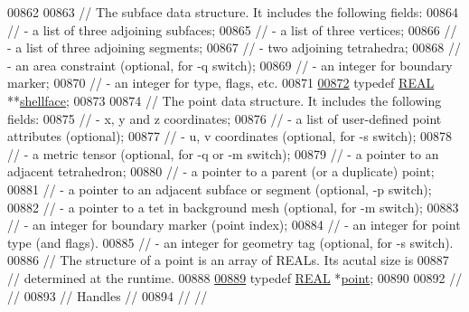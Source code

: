 \begin{DoxyCode}
00862 
00863   \textcolor{comment}{// The subface data structure.  It includes the following fields:}
00864   \textcolor{comment}{//   - a list of three adjoining subfaces;}
00865   \textcolor{comment}{//   - a list of three vertices;}
00866   \textcolor{comment}{//   - a list of three adjoining segments;}
00867   \textcolor{comment}{//   - two adjoining tetrahedra;}
00868   \textcolor{comment}{//   - an area constraint (optional, for -q switch);}
00869   \textcolor{comment}{//   - an integer for boundary marker;}
00870   \textcolor{comment}{//   - an integer for type, flags, etc.}
00871 
\hypertarget{tetgen_8h_source.tex_l00872}{}\hyperlink{classtetgenmesh_ad4860123b88783b943fa6452e886a2cb}{00872}   \textcolor{keyword}{typedef} \hyperlink{tetgen_8h_a4b654506f18b8bfd61ad2a29a7e38c25}{REAL} **\hyperlink{classtetgenmesh_ad4860123b88783b943fa6452e886a2cb}{shellface};
00873 
00874   \textcolor{comment}{// The point data structure.  It includes the following fields:}
00875   \textcolor{comment}{//   - x, y and z coordinates;}
00876   \textcolor{comment}{//   - a list of user-defined point attributes (optional);}
00877   \textcolor{comment}{//   - u, v coordinates (optional, for -s switch);}
00878   \textcolor{comment}{//   - a metric tensor (optional, for -q or -m switch);}
00879   \textcolor{comment}{//   - a pointer to an adjacent tetrahedron;}
00880   \textcolor{comment}{//   - a pointer to a parent (or a duplicate) point;}
00881   \textcolor{comment}{//   - a pointer to an adjacent subface or segment (optional, -p switch);}
00882   \textcolor{comment}{//   - a pointer to a tet in background mesh (optional, for -m switch);}
00883   \textcolor{comment}{//   - an integer for boundary marker (point index);}
00884   \textcolor{comment}{//   - an integer for point type (and flags).}
00885   \textcolor{comment}{//   - an integer for geometry tag (optional, for -s switch).}
00886   \textcolor{comment}{// The structure of a point is an array of REALs.  Its acutal size is }
00887   \textcolor{comment}{//   determined at the runtime.}
00888 
\hypertarget{tetgen_8h_source.tex_l00889}{}\hyperlink{classtetgenmesh_ace3fb4f80389185b7c9b18ab69a3dea2}{00889}   \textcolor{keyword}{typedef} \hyperlink{tetgen_8h_a4b654506f18b8bfd61ad2a29a7e38c25}{REAL} *\hyperlink{classtetgenmesh_ace3fb4f80389185b7c9b18ab69a3dea2}{point};
00890 
00892 \textcolor{comment}{//                                                                           //}
00893 \textcolor{comment}{// Handles                                                                   //}
00894 \textcolor{comment}{//                                                                           //}

\end{DoxyCode}
